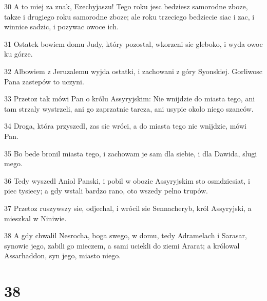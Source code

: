 \par 30 A to miej za znak, Ezechyjaszu! Tego roku jesc bedziesz samorodne zboze, takze i drugiego roku samorodne zboze; ale roku trzeciego bedziecie siac i zac, i winnice sadzic, i pozywac owoce ich.
\par 31 Ostatek bowiem domu Judy, który pozostal, wkorzeni sie gleboko, i wyda owoc ku górze.
\par 32 Albowiem z Jeruzalemu wyjda ostatki, i zachowani z góry Syonskiej. Gorliwosc Pana zastepów to uczyni.
\par 33 Przetoz tak mówi Pan o królu Assyryjskim: Nie wnijdzie do miasta tego, ani tam strzaly wystrzeli, ani go zaprzatnie tarcza, ani usypie okolo niego szanców.
\par 34 Droga, która przyszedl, zas sie wróci, a do miasta tego nie wnijdzie, mówi Pan.
\par 35 Bo bede bronil miasta tego, i zachowam je sam dla siebie, i dla Dawida, slugi mego.
\par 36 Tedy wyszedl Aniol Panski, i pobil w obozie Assyryjskim sto osmdziesiat, i piec tysiecy; a gdy wstali bardzo rano, oto wszedy pelno trupów.
\par 37 Przetoz ruszywszy sie, odjechal, i wrócil sie Sennacheryb, król Assyryjski, a mieszkal w Niniwie.
\par 38 A gdy chwalil Nesrocha, boga swego, w domu, tedy Adramelach i Sarasar, synowie jego, zabili go mieczem, a sami uciekli do ziemi Ararat; a królowal Assarhaddon, syn jego, miasto niego.

\chapter{38}

